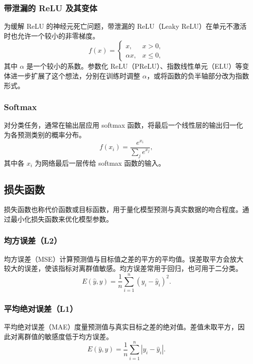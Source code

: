 \subsubsection{带泄漏的 ReLU 及其变体}
为缓解 ReLU 的神经元死亡问题，带泄漏的 ReLU（Leaky ReLU）在单元不激活时也允许一个较小的非零梯度。
\begin{equation}
f(x)=
\begin{cases}
x,&x>0,\\
\alpha x,&x\leq 0,
\end{cases}
\label{eq:appa-leaky-relu}
\end{equation}
其中 $\alpha$ 是一个较小的系数。参数化 ReLU（PReLU）、指数线性单元（ELU）等变体进一步扩展了这个想法，分别在训练时调整 $\alpha$，或将函数的负半轴部分改为指数形式。

\subsubsection{Softmax}
对分类任务，通常在输出层应用 softmax 函数，将最后一个线性层的输出归一化为各预测类别的概率分布。
\begin{equation}
f(x_i)=\frac{e^{x_i}}{\sum_j e^{x_j}},
\label{eq:appa-softmax}
\end{equation}
其中各 $x_i$ 为网络最后一层传给 softmax 函数的输入。

\subsection{损失函数}
\label{sec:appa-losses}
损失函数也称代价函数或目标函数，用于量化模型预测与真实数据的吻合程度。通过最小化损失函数来优化模型参数。

\subsubsection{均方误差（L2）}
均方误差（MSE）计算预测值与目标值之差的平方的平均值。误差取平方会放大较大的误差，使该指标对离群值敏感。均方误差常用于回归，也可用于二分类。
\begin{equation}
E(\hat{y},y)=\frac1n\sum_{i=1}^{n}(y_i-\hat{y}_i)^2.
\label{eq:appa-mse}
\end{equation}

\subsubsection{平均绝对误差（L1）}
平均绝对误差（MAE）度量预测值与真实目标之差的绝对值。差值未取平方，因此对离群值的敏感度低于均方误差。
\begin{equation}
E(\hat{y},y)=\frac1n\sum_{i=1}^{n}|y_i-\hat{y}_i|.
\label{eq:appa-mae}
\end{equation}

